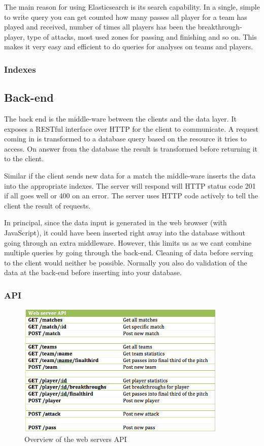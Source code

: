 The main reason for using Elasticsearch is its search capability. In a single, simple to write query you can get counted how many passes all player for a team has played and received, number of times all players has been the breakthrough-player, type of attacks, most used zones for passing and finishing and so on. This makes it very easy and efficient to do queries for analyses on teams and players.  


\subsubsection{Indexes}


\subsection{Back-end}

The back end is the middle-ware between the clients and the data layer. It exposes a RESTful interface over HTTP for the client to communicate. A request coming in is transformed to a database query based on the resource it tries to access. On answer from the database the result is transformed before returning it to the client. 

Similar if the client sends new data for a match the middle-ware inserts the data into the appropriate indexes. The server will respond will HTTP status code 201 if all goes well or 400 on an error. The server uses HTTP code actively to tell the client the result of requests.

In principal, since the data input is generated in the web browser (with JavaScript), it could have been inserted right away into the database without going through an extra middleware. However, this limits us as we cant combine multiple queries by going through the back-end. Cleaning of data before serving to the client would neither be possible. Normally you also do validation of the data at the back-end before inserting into your database.

\subsubsection{API}

\begin{figure}[ht!]
\centering
\includegraphics[width=100mm]{images/implementation/API.png}
\caption{Overview of the web servers API}
\label{overflow}
\end{figure}

